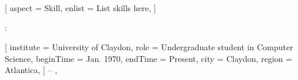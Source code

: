 \newcommand{\resumeSubheadingOneLineInternal}[2]{
    \resumeStyleClusterPaddingBefore \item
    \begin{tabular*}{0.986\textwidth}{l@{\extracolsep{\fill}}r}
        \small #1 & #2 \\
    \end{tabular*}
    \resumeStylefixSingleSubheading
}

\newcommand{\resumeClusterItemList}[1]{
    \resumeStyleItemListPaddingBefore
    \begin{itemize}[leftmargin=1.6em, rightmargin=0.007\textwidth]
        \justifying
        #1
    \end{itemize}
}

\newkeycommand{\resumeSkillCluster}[
        aspect = Skill,
        enlist = List skills here,
]{
    \resumeStylefixSkillItem \resumeStyleItemPaddingBefore
    \small \item \textbf{}{: }
}

\newkeycommand{\resumeEducationCluster}[
        institute = University of Claydon,
        role = Undergraduate student in Computer Science,
        beginTime = Jan. 1970,
        endTime = Present,
        city = Claydon,
        region = Atlantica,
]{
    \resumeSubheadingTwoLinesInternal
        {}
        {}
        { -- }
        {, }
}

